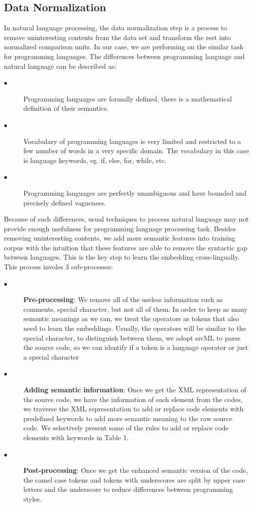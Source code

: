 \subsection{Data Normalization}

In natural language processing, the data normalization step is a process to remove uninteresting contents from the data set and transform the rest into normalized comparison units. In our case, we are performing on the similar task for programming languages. The differences between programming language and natural language can be described as:
\begin{description}
	\item [$\bullet$] Programming languages are formally defined, there is a mathematical definition of their semantics.
	\item [$\bullet$] Vocabulary of programming languages is very limited and restricted to a few number of words in a very specific domain. The vocabulary in this case is language keywords, eg. if, else, for, while, etc.
	\item [$\bullet$] Programming languages are perfectly unambiguous and have bounded and precisely defined vagueness.
\end{description}
Because of such differences, usual techniques to process natural language may not provide enough usefulness for programming language processing task.
Besides removing uninteresting contents, we add more semantic features into training corpus with the intuition that these features are able to remove the syntactic gap between languages. This is the key step to learn the embedding cross-lingually. This process involes 3 sub-processes:

\begin{description}
	\item [$\bullet$] \textbf{Pre-processing}: We remove all of the useless information such as comments, special character, but not all of them. In order to keep as many semantic meanings as we can, we treat the operators as tokens that also need to learn the embeddings. Usually, the operators will be similar to the special character, to distinguish between them, we adopt srcML \cite{collard2011lightweight} to parse the source code, so we can identify if a token is a language operator or just a special character
	\item [$\bullet$] \textbf{Adding semantic information}: Once we get the XML representation of the source code, we have the information of each element from the codes, we traverse the XML representation to add or replace code elements with predefined keywords to add more semantic meaning to the raw source code. We selectively present some of the rules to add or replace code elements with keywords in Table 1.
	\item [$\bullet$] \textbf{Post-processing}: Once we get the enhanced semantic version of the code, the camel case tokens and tokens with underscores are split by upper case letters and the underscore to reduce differences between programming styles.
\end{description}

